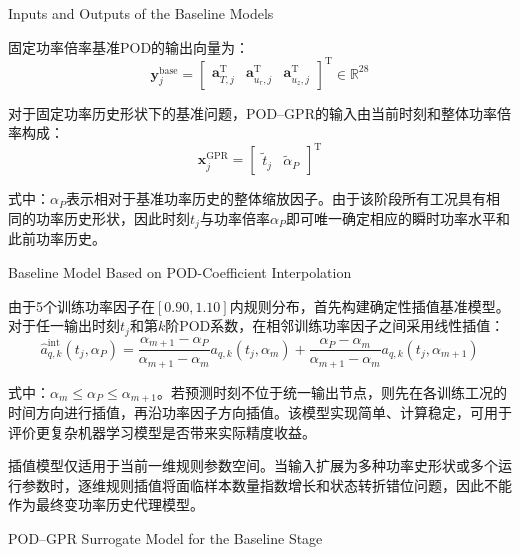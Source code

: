 {Inputs and Outputs of the Baseline Models}

固定功率倍率基准POD的输出向量为：
\begin{equation}
	\boldsymbol y_j^{\mathrm{base}}
	=
	\begin{bmatrix}
		\boldsymbol a_{T,j}^{\mathrm T} &
		\boldsymbol a_{u_r,j}^{\mathrm T} &
		\boldsymbol a_{u_z,j}^{\mathrm T}
	\end{bmatrix}^{\mathrm T}
	\in\mathbb R^{28}
	\label{eq:baseline_surrogate_output}
\end{equation}

对于固定功率历史形状下的基准问题，POD--GPR的输入由当前时刻和整体功率倍率构成：
\begin{equation}
	\boldsymbol{x}_j^{\mathrm{GPR}}
	=
	\begin{bmatrix}
		\widetilde{t}_j &
		\widetilde{\alpha}_P
	\end{bmatrix}^{\mathrm T}
	\label{eq:baseline_gpr_features}
\end{equation}

\noindent 式中：$\alpha_P$表示相对于基准功率历史的整体缩放因子。由于该阶段所有工况具有相同的功率历史形状，因此时刻$t_j$与功率倍率$\alpha_P$即可唯一确定相应的瞬时功率水平和此前功率历史。

{Baseline Model Based on POD-Coefficient Interpolation}

由于5个训练功率因子在$[0.90,1.10]$内规则分布，首先构建确定性插值基准模型。对于任一输出时刻$t_j$和第$k$阶POD系数，在相邻训练功率因子之间采用线性插值：
\begin{equation}
	\widehat{a}_{q,k}^{\mathrm{int}}(t_j,\alpha_P)
	=
	\frac{\alpha_{m+1}-\alpha_P}{\alpha_{m+1}-\alpha_m}
	a_{q,k}(t_j,\alpha_m)
	+
	\frac{\alpha_P-\alpha_m}{\alpha_{m+1}-\alpha_m}
	a_{q,k}(t_j,\alpha_{m+1})
	\label{eq:pod_coefficient_interpolation}
\end{equation}

\noindent 式中：$\alpha_m\leq\alpha_P\leq\alpha_{m+1}$。若预测时刻不位于统一输出节点，则先在各训练工况的时间方向进行插值，再沿功率因子方向插值。该模型实现简单、计算稳定，可用于评价更复杂机器学习模型是否带来实际精度收益。

插值模型仅适用于当前一维规则参数空间。当输入扩展为多种功率史形状或多个运行参数时，逐维规则插值将面临样本数量指数增长和状态转折错位问题，因此不能作为最终变功率历史代理模型。

{POD--GPR Surrogate Model for the Baseline Stage}

